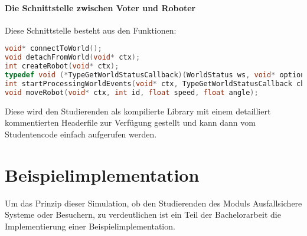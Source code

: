 \paragraph{Die Schnittstelle zwischen Voter und Roboter} Diese Schnittstelle besteht aus den Funktionen:
\begin{lstlisting}[frame=single, language=c] 
void* connectToWorld();
void detachFromWorld(void* ctx);
int createRobot(void* ctx);
typedef void (*TypeGetWorldStatusCallback)(WorldStatus ws, void* optional);
int startProcessingWorldEvents(void* ctx, TypeGetWorldStatusCallback cb, void* optional);
void moveRobot(void* ctx, int id, float speed, float angle);
\end{lstlisting}

Diese wird den Studierenden als kompilierte Library mit einem detailliert kommentierten Headerfile zur Verf{\"{u}}gung gestellt und kann
dann vom Studentencode einfach aufgerufen werden.


\clearpage
\section{Beispielimplementation}
Um das Prinzip dieser Simulation, ob den Studierenden des Moduls Ausfallsichere Systeme oder Besuchern, zu verdeutlichen ist ein Teil der Bachelorarbeit die Implementierung einer
Beispielimplementation.

